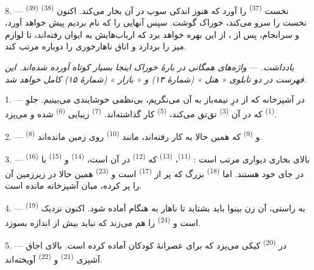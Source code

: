 8. ---  \textsuperscript{(39)} نخست 
\textsuperscript{(37)} را آورد که هنوز اندکی سوپ در آن بخار می‌کند.
اکنون  \textsuperscript{(38)} نخست را سرو می‌کند، خوراک
گوشت. سپس آنهایی را که نام بردیم پیش خواهد آورد، و سرانجام، پس از
، از این بهره خواهد برد که ارباب‌هایش به ایوان رفته‌اند، تا
لوازم میز را بردارد و اتاق ناهارخوری را دوباره مرتب کند.

\textit{یادداشت.} --- \textit{واژه‌های همگانی در بارهٔ خوراک اینجا
بسیار کوتاه آورده شده‌اند. این فهرست در دو تابلوی « هتل » (شمارهٔ ۱۳) و
« بازار » (شمارهٔ ۱۵) کامل خواهد شد.}

\VUsaut{4.6mm}
\VUsaut{3.0mm}

1. --- در آشپزخانه که از درِ نیمه‌باز به آن می‌نگریم، بی‌نظمی خوشایندی
می‌بینیم. جلوِ  \textsuperscript{(1)} که در آن
 \textsuperscript{(3)} تق‌تق می‌کند، 
\textsuperscript{(5)} کار گذاشته‌اند. 
\textsuperscript{(7)} زیبایی  \textsuperscript{(6)}
شده و می‌پزد.

2. ---  \textsuperscript{(8)} و 
\textsuperscript{(9)} که همین حالا به کار رفته‌اند، مانند 
\textsuperscript{(10)} روی زمین مانده‌اند.

3. --- بالای بخاری دیواری مرتب است : 
\textsuperscript{(11)}،  \textsuperscript{(13)} که
 \textsuperscript{(12)} در آن است، 
\textsuperscript{(14)} و  \textsuperscript{(15)} با
 \textsuperscript{(16)} در جای خود هستند. اما  \textsuperscript{(18)} بزرگ که پر از 
\textsuperscript{(17)} است و  \textsuperscript{(23)} همین
حالا در زیرزمین آن را پر کرده، میان آشپزخانه مانده است.

4. --- به راستی، آن زن بینوا باید بشتابد تا ناهار به هنگام آماده شود.
اکنون نزدیک  \textsuperscript{(19)} است و
 \textsuperscript{(24)} را هم می‌زند که نباید بیش از اندازه
بسوزد.

5. --- در  \textsuperscript{(20)} کیکی می‌پزد که برای عصرانهٔ
کودکان آماده کرده است. بالای اجاق آشپزی 
\textsuperscript{(21)} و  \textsuperscript{(22)} آویخته‌اند.

\VUsaut{4.0mm}
\VUsaut{3.0mm}

